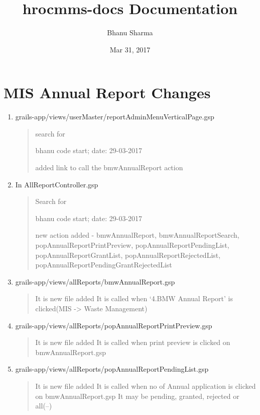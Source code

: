 \documentclass[letterpaper,10pt,english]{sphinxmanual}
\title{hrocmms-docs Documentation}
\date{Mar 31, 2017}
\author{Bhanu Sharma}
\begin{document}
\maketitle
\sphinxtableofcontents
{}\label{\detokenize{index::doc}}



\chapter{MIS Annual Report Changes}
\label{\detokenize{MIS Annual Report Changes:mis-annual-report-changes}}\label{\detokenize{MIS Annual Report Changes::doc}}\label{\detokenize{MIS Annual Report Changes:welcome-to-hrocmms-docs-s}}\begin{enumerate}
\item {} 
grails-app/views/userMaster/reportAdminMenuVerticalPage.gsp
\begin{quote}

search for

bhanu code start; date: 29-03-2017

added link to call the bmwAnnualReport action
\end{quote}

\item {} 
In AllReportController.gsp
\begin{quote}

Search for

bhanu code start; date: 29-03-2017

new action added - bmwAnnualReport, bmwAnnualReportSearch, popAnnualReportPrintPreview, popAnnualReportPendingList,
popAnnualReportGrantList, popAnnualReportRejectedList, popAnnualReportPendingGrantRejectedList
\end{quote}

\item {} 
grails-app/views/allReports/bmwAnnualReport.gsp
\begin{quote}

It is new file added
It is called when `4.BMW Annual Report' is clicked(MIS -\textgreater{} Waste Management)
\end{quote}

\item {} 
grails-app/views/allReports/popAnnualReportPrintPreview.gsp
\begin{quote}

It is new file added
It is called when print preview is clicked on bmwAnnualReport.gsp
\end{quote}

\item {} 
grails-app/views/allReports/popAnnualReportPendingList.gsp
\begin{quote}

It is new file added
It is called when no of Annual application is clicked on bmwAnnualReport.gsp
It may be pending, granted, rejected or all(--)
\end{quote}

\end{enumerate}
\end{document}
